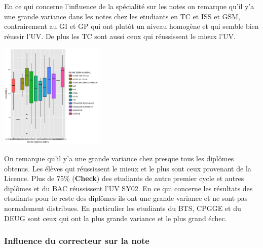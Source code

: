 \documentclass[10pt]{article}
\begin{document}
En ce qui concerne l'influence de la spécialité sur les notes on remarque qu'il y'a une grande variance dans les  notes chez les etudiants en  TC et ISS et GSM, contrairement au GI et GP qui ont plutôt un niveau homogène et qui semble bien réussir l'UV. De plus les TC sont aussi ceux qui réussissent le mieux l'UV.
\begin{center}
	\includegraphics[width=50mm]{Figures/Notes/diplome_resultat.png}
	\label{fig:formation_resultat}	
	\end{center}

		On remarque qu'il y'a une grande variance chez  presque tous les diplômes obtenus. Les élèves qui réussissent le mieux et le plus sont ceux provenant de la Licence.  Plus de 75\%  (\textbf{Check}) des etudiants de autre premier  cycle et autres diplômes et  du BAC réussissent l'UV SY02. En ce qui concerne les résultats des etudiants pour le reste des diplômes ils ont une grande variance et ne sont pas normalement distribues. En particulier les etudiants du BTS, CPGGE et du DEUG sont ceux qui ont la plus grande variance et le plus grand échec.


\subsubsection{Influence du correcteur sur la note}
\end{document}
